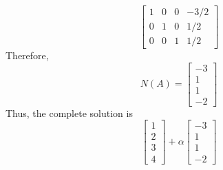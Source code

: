 \begin{enumerate}[label=(\alph*)]
\begin{mdframed}[style=MyFrame]
\begin{equation}
\begin{bmatrix}
                    1       &   0   &   0   &   -3/2    \\
                    0       &   1   &   0   &   1/2     \\
                    0       &   0   &   1   &   1/2
                \end{bmatrix}
            \end{equation}
            Therefore,
            \begin{equation}
                N(A) =
                \begin{bmatrix}
                    -3      \\
                    1       \\
                    1       \\
                    -2
                \end{bmatrix}
            \end{equation}
            Thus, the complete solution is
            \begin{equation}
                \begin{bmatrix}
                    1       \\
                    2       \\
                    3       \\
                    4
                \end{bmatrix}
                +
                \alpha
                \begin{bmatrix}
                    -3      \\
                    1       \\
                    1       \\
                    -2
                \end{bmatrix}
            \end{equation}
        \end{mdframed}
\end{enumerate}






                    
